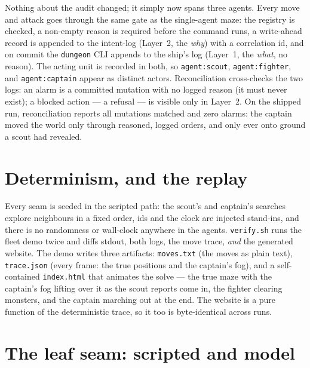 \documentclass[11pt]{article}
\newcommand{\code}[1]{\texttt{#1}}
\begin{document}
Nothing about the audit changed; it simply now spans three agents. Every move and
attack goes through the same gate as the single-agent maze: the registry is checked,
a non-empty reason is required before the command runs, a write-ahead record is
appended to the intent-log (Layer~2, the \emph{why}) with a correlation id, and on
commit the \code{dungeon} CLI appends to the ship's log (Layer~1, the \emph{what},
no reason). The acting unit is recorded in both, so \code{agent:scout},
\code{agent:fighter}, and \code{agent:captain} appear as distinct actors.
Reconciliation cross-checks the two logs: an alarm is a committed mutation with no
logged reason (it must never exist); a blocked action --- a refusal --- is visible
only in Layer~2. On the shipped run, reconciliation reports all mutations matched and
zero alarms: the captain moved the world only through reasoned, logged orders, and
only ever onto ground a scout had revealed.

\section{Determinism, and the replay}

Every seam is seeded in the scripted path: the scout's and captain's searches
explore neighbours in a fixed order, ids and the clock are injected stand-ins, and
there is no randomness or wall-clock anywhere in the agents. \code{verify.sh} runs
the fleet demo twice and diffs stdout, both logs, the move trace, \emph{and} the
generated website. The demo writes three artifacts: \code{moves.txt} (the moves as
plain text), \code{trace.json} (every frame: the true positions and the captain's
fog), and a self-contained \code{index.html} that animates the solve --- the true
maze with the captain's fog lifting over it as the scout reports come in, the fighter
clearing monsters, and the captain marching out at the end. The website is a pure
function of the deterministic trace, so it too is byte-identical across runs.

\section{The leaf seam: scripted and model}
\end{document}
